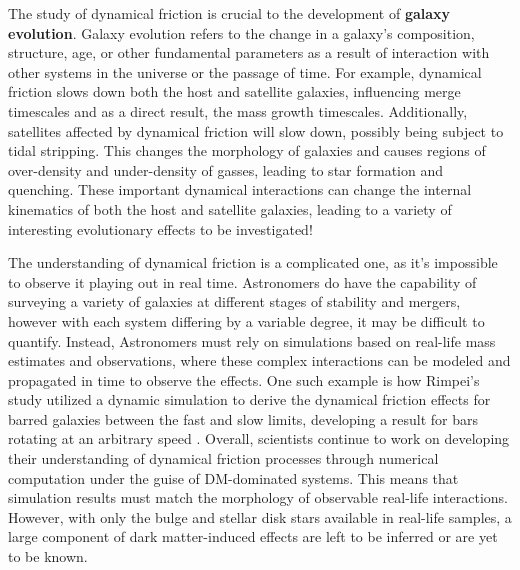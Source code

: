 \documentclass[fleqn,usenatbib]{mnras}
\begin{document}
\hspace{\parindent} The study of dynamical friction is crucial to the development of \textbf{galaxy evolution}. Galaxy evolution refers to the change in a galaxy's composition, structure, age, or other fundamental parameters as a result of interaction with other systems in the universe or the passage of time. For example, dynamical friction slows down both the host and satellite galaxies, influencing merge timescales and as a direct result, the mass growth timescales. Additionally, satellites affected by dynamical friction will slow down, possibly being subject to tidal stripping. This changes the morphology of galaxies and causes regions of over-density and under-density of gasses, leading to star formation and quenching. These important dynamical interactions can change the internal kinematics of both the host and satellite galaxies, leading to a variety of interesting evolutionary effects to be investigated!

\vspace{10pt}

\hspace{\parindent} The understanding of dynamical friction is a complicated one, as it's impossible to observe it playing out in real time. Astronomers do have the capability of surveying a variety of galaxies at different stages of stability and mergers, however with each system differing by a variable degree, it may be difficult to quantify. Instead, Astronomers must rely on simulations based on real-life mass estimates and observations, where these complex interactions can be modeled and propagated in time to observe the effects. One such example is how Rimpei's study utilized a dynamic simulation to derive the dynamical friction effects for barred galaxies between the fast and slow limits, developing a result for bars rotating at an arbitrary speed \citep{RimpeiChiba}. Overall, scientists continue to work on developing their understanding of dynamical friction processes through numerical computation under the guise of DM-dominated systems. This means that simulation results must match the morphology of observable real-life interactions. However, with only the bulge and stellar disk stars available in real-life samples, a large component of dark matter-induced effects are left to be inferred or are yet to be known. 

\vspace{10pt}
\end{document}
